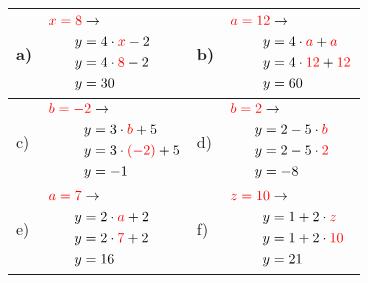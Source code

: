 \documentclass[12pt]{article}
\begin{document}
\begin{xltabular}{\textwidth}{|C{0.75cm}|X|C{0.75cm}|X|}
\hline
a)&$\begin{aligned}
\textcolor{red}{x=8} & \rightarrow\\
y&=4 \cdot \textcolor{red}{x} - 2\\
y&=4 \cdot \textcolor{red}{8} - 2\\
y&=30\\
\end{aligned}$
&
b)&$\begin{aligned}
\textcolor{red}{a=12} & \rightarrow\\
y&=4 \cdot \textcolor{red}{a} + \textcolor{red}{a}\\
y&=4 \cdot \textcolor{red}{12} + \textcolor{red}{12}\\
y&=60\\
\end{aligned}$
\\\hline
c)&$\begin{aligned}
\textcolor{red}{b=-2} & \rightarrow\\
y&=3 \cdot \textcolor{red}{b} + 5\\
y&=3 \cdot \textcolor{red}{(-2)} + 5\\
y&=-1\\
\end{aligned}$
&
d)&$\begin{aligned}
\textcolor{red}{b=2} & \rightarrow\\
y&=2 - 5 \cdot \textcolor{red}{b}\\
y&=2 - 5 \cdot \textcolor{red}{2}\\
y&=-8\\
\end{aligned}$
\\\hline
e)&$\begin{aligned}
\textcolor{red}{a=7} & \rightarrow\\
y&=2 \cdot \textcolor{red}{a} + 2\\
y&=2 \cdot \textcolor{red}{7} + 2\\
y&=16\\
\end{aligned}$
&
f)&$\begin{aligned}
\textcolor{red}{z=10} & \rightarrow\\
y&=1 + 2 \cdot \textcolor{red}{z}\\
y&=1 + 2 \cdot \textcolor{red}{10}\\
y&=21\\
\end{aligned}$

\end{xltabular}
\end{document}
